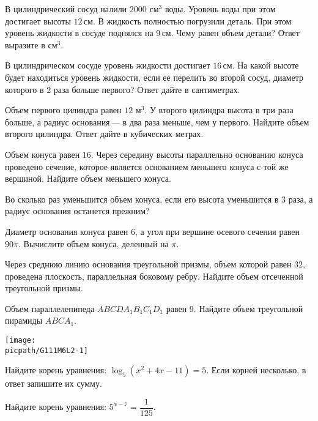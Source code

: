 \begin{class}[number=2]
\begin{listofex}
		\item В цилиндрический сосуд налили \(2000\) см\(^3\) воды. Уровень воды при этом достигает высоты \(12\) см. В жидкость полностью погрузили деталь. При этом уровень жидкости в сосуде поднялся на \(9\) см. Чему равен объем детали? Ответ выразите в см\(^3\).
		\item В цилиндрическом сосуде уровень жидкости достигает \(16\) см. На какой высоте будет находиться уровень жидкости, если ее перелить во второй сосуд, диаметр которого в \(2\) раза больше первого? Ответ дайте в сантиметрах.
		\item Объем первого цилиндра равен \(12\) м\(^3\). У второго цилиндра высота в три раза больше, а радиус основания --- в два раза меньше, чем у первого. Найдите объем второго цилиндра. Ответ дайте в кубических метрах.
		\item Объем конуса равен \(16\). Через середину высоты параллельно основанию конуса проведено сечение, которое является основанием меньшего конуса с той же вершиной. Найдите объем меньшего конуса.
		\item Во сколько раз уменьшится объем конуса, если его высота уменьшится в \(3\) раза, а радиус основания останется прежним?
		\item Диаметр основания конуса равен \(6\), а угол при вершине осевого сечения равен \(90\pi \). Вычислите объем конуса, деленный на \( \pi \).
		\item Через среднюю линию основания треугольной призмы, объем которой равен \(32\), проведена плоскость, параллельная боковому ребру. Найдите объем отсеченной треугольной призмы.
		\item 
		\begin{minipage}[t]{\bodywidth}
			Объем параллелепипеда \(ABCDA_1B_1C_1D_1\) равен \(9\). Найдите объем треугольной пирамиды \(ABCA_1\).
		\end{minipage}
		\hspace{0.02\linewidth}
		\begin{minipage}[t]{\picwidth}
			\texttt{[image: \\picpath/G111M6L2-1]}
		\end{minipage}
		\item Найдите корень уравнения: \( \log_5(x^2+4x-11)=5 \). Если корней несколько, в ответ запишите их сумму.
		\item Найдите корень уравнения: \( 5^{x-7}=\dfrac{1}{125} \).
	\end{listofex}
\end{class}

